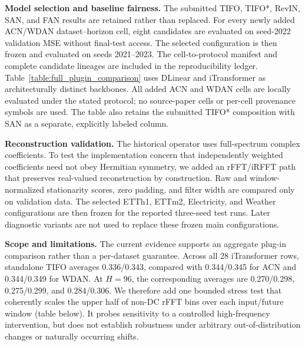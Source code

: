 \documentclass[sigconf,anonymous,review]{acmart}
\newcommand{\resubmitchange}[1]{#1}
\begin{document}
\noindent\textbf{Model selection and baseline fairness.}
The submitted TIFO, TIFO*, RevIN, SAN, and FAN results are retained rather than
replaced. For every newly added ACN/WDAN dataset--horizon cell, eight candidates
are evaluated on seed-2022 validation MSE without final-test access. The selected
configuration is then frozen and evaluated on seeds 2021--2023. The
cell-to-protocol manifest and complete candidate lineages are included in the
reproducibility ledger. Table~\ref{table:full_plugin_comparison} uses DLinear
and iTransformer as architecturally distinct backbones.
\resubmitchange{All added ACN and WDAN cells are locally evaluated under the
stated protocol; no source-paper cells or per-cell provenance symbols are used.
The table also retains the submitted TIFO* composition with SAN as a separate,
explicitly labeled column.}

\noindent\textbf{Reconstruction validation.}
The historical operator uses full-spectrum complex coefficients. To test the
implementation concern that independently weighted coefficients need not obey
Hermitian symmetry, we added an rFFT/iRFFT path that preserves real-valued
reconstruction by construction. Raw and window-normalized stationarity scores,
zero padding, and filter width are compared only on validation data. The selected
ETTh1, ETTm2, Electricity, and Weather configurations are then frozen for the
reported three-seed test runs. Later diagnostic variants are not used to replace
these frozen main configurations.

\noindent\textbf{Scope and limitations.}
The current evidence supports an aggregate plug-in comparison rather than a
per-dataset guarantee. \resubmitchange{Across all 28 iTransformer rows,
standalone TIFO averages 0.336/0.343, compared with 0.344/0.345 for ACN and
0.344/0.349 for WDAN. At $H=96$, the corresponding averages are 0.270/0.298,
0.275/0.299, and 0.284/0.306.} We therefore add one bounded
stress test that coherently scales the upper half of non-DC rFFT bins over each
input/future window (table below). It probes sensitivity to
a controlled high-frequency intervention, but does not establish robustness
under arbitrary out-of-distribution changes or naturally occurring shifts.

\begin{table}[H]
\centering
\caption*{Controlled high-frequency shift stress test over three seeds. Cells report
Ori/TIFO MSE; Effect is TIFO's relative MSE reduction over Ori.}
\small
{}
\end{table}
\end{document}
